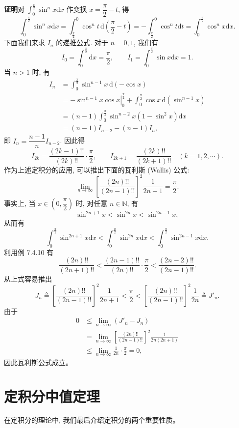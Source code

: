 \documentclass[UTF8,12pt,a4paper,fontset=fandol]{ctexart}
\begin{document}
\noindent\textbf{证明}\quad 对 $\int_0^{\frac{\pi}{2}}\sin^n x\mathrm dx$ 作变换 $x=\dfrac{\pi}{2}-t$, 得
\[
  \int_0^{\frac{\pi}{2}}\sin^n x\mathrm dx
  =\int_{\frac{\pi}{2}}^0 \cos^n t\,\mathrm d\left(\frac{\pi}{2}-t\right)
  =-\int_{\frac{\pi}{2}}^0 \cos^n t\mathrm dt
  =\int_0^{\frac{\pi}{2}}\cos^n x\mathrm dx.
\]
下面我们来求 $I_n$ 的递推公式. 对于 $n=0,1$, 我们有
\[
  I_0=\int_0^{\frac{\pi}{2}}\mathrm dx=\frac{\pi}{2},\qquad
  I_1=\int_0^{\frac{\pi}{2}}\sin x\mathrm dx=1.
\]
当 $n>1$ 时, 有
\[
\begin{aligned}
  I_n&=\int_0^{\frac{\pi}{2}}\sin^{n-1}x\,\mathrm d(-\cos x)\\
  &=-\left.\sin^{n-1}x\cos x\right|_0^{\frac{\pi}{2}}
  +\int_0^{\frac{\pi}{2}}\cos x\,\mathrm d(\sin^{n-1}x)\\
  &=(n-1)\int_0^{\frac{\pi}{2}}\sin^{n-2}x(1-\sin^2x)\mathrm dx\\
  &=(n-1)I_{n-2}-(n-1)I_n,
\end{aligned}
\]
即 $I_n=\dfrac{n-1}{n}I_{n-2}$. 因此得
\[
  I_{2k}=\frac{(2k-1)!!}{(2k)!!}\cdot\frac{\pi}{2},\qquad
  I_{2k+1}=\frac{(2k)!!}{(2k+1)!!}\quad(k=1,2,\cdots).
\]
作为上述定积分的应用, 可以推出下面的瓦利斯 (Wallis) 公式:
\[
  \lim_{n\to\infty}\left[\frac{(2n)!!}{(2n-1)!!}\right]^2\frac{1}{2n+1}=\frac{\pi}{2}.
\]
事实上, 当 $x\in\left(0,\dfrac{\pi}{2}\right)$ 时, 对任意 $n\in\mathbb N$, 有
\[
  \sin^{2n+1}x<\sin^{2n}x<\sin^{2n-1}x,
\]
从而有
\[
  \int_0^{\frac{\pi}{2}}\sin^{2n+1}x\mathrm dx
  <\int_0^{\frac{\pi}{2}}\sin^{2n}x\mathrm dx
  <\int_0^{\frac{\pi}{2}}\sin^{2n-1}x\mathrm dx.
\]
利用例 7.4.10 有
\[
  \frac{(2n)!!}{(2n+1)!!}
  <\frac{(2n-1)!!}{(2n)!!}\cdot\frac{\pi}{2}
  <\frac{(2n-2)!!}{(2n-1)!!}.
\]
从上式容易推出
\[
  J_n\triangleq\left[\frac{(2n)!!}{(2n-1)!!}\right]^2\frac{1}{2n+1}
  <\frac{\pi}{2}
  <\left[\frac{(2n)!!}{(2n-1)!!}\right]^2\frac{1}{2n}\triangleq J'_n.
\]
由于
\[
\begin{aligned}
  0&\leq\lim_{n\to\infty}(J'_n-J_n)\\
  &=\lim_{n\to\infty}
  \left[\frac{(2n)!!}{(2n-1)!!}\right]^2\frac{1}{2n(2n+1)}\\
  &\leq\lim_{n\to\infty}\frac{1}{2n}\cdot\frac{\pi}{2}=0,
\end{aligned}
\]
因此瓦利斯公式成立。

\section{定积分中值定理}

在定积分的理论中, 我们最后介绍定积分的两个重要性质。
\end{document}
